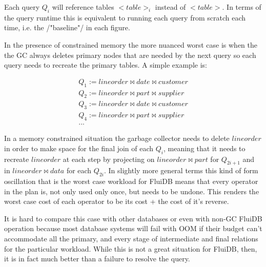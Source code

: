   Each query \(Q_i\) will reference tables \(<table>_i\) instead of
  \(<table>\). In terms of the query runtime this is equivalent to
  running each query from scratch each time, i.e. the /"baseline"/ in
  each figure.

  In the presence of constrained memory the more nuanced worst case is
  when the the GC always deletes primary nodes that are needed by the
  next query so each query needs to recreate the primary tables. A
  simple example is:


  \begin{align*}
    Q_1 := lineorder \Join date \Join customer \\
    Q_2 := lineorder \Join part \Join supplier \\
    Q_3 := lineorder \Join date \Join customer \\
    Q_4 := lineorder \Join part \Join supplier \\
    ...
  \end{align*}

  In a memory constrained situation the garbage collector needs to
  delete \(lineorder\) in order to make space for the final join of each
  \(Q_i\), meaning that it needs to recreate \(lineorder\) at each step
  by projecting on \(lineorder \Join part\) for \(Q_{2i + 1}\) and in
  \(lineorder \Join data\) for each \(Q_{2i}\). In slightly more general
  terms this kind of form oscillation that is the worst case workload
  for FluiDB means that every operator in the plan is, not only used
  only once, but needs to be undone. This renders the worst case cost of
  each operator to be its cost + the cost of it's reverse.

  It is hard to compare this case with other databases or even with
  non-GC FluiDB operation because most database systems will fail with
  OOM if their budget can't accommodate all the primary, and every stage
  of intermediate and final relations for the particular workload. While
  this is not a great situation for FluiDB, then, it is in fact much
  better than a failure to resolve the query.

